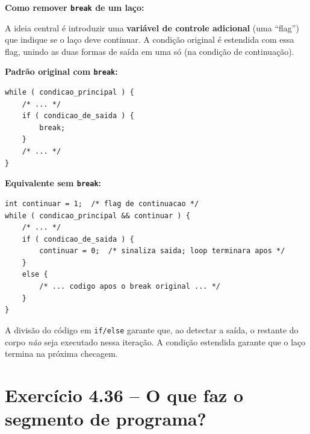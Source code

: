 \documentclass[12pt,a4paper]{article}
\begin{document}
\begin{respostabox}
\textbf{Como remover \texttt{break} de um laço:}

A ideia central é introduzir uma \textbf{variável de controle adicional} (uma ``flag'')
que indique se o laço deve continuar. A condição original é estendida com essa flag,
unindo as duas formas de saída em uma só (na condição de continuação).

\textbf{Padrão original com \texttt{break}:}
\begin{lstlisting}
while ( condicao_principal ) {
    /* ... */
    if ( condicao_de_saida ) {
        break;
    }
    /* ... */
}
\end{lstlisting}

\textbf{Equivalente sem \texttt{break}:}
\begin{lstlisting}
int continuar = 1;  /* flag de continuacao */
while ( condicao_principal && continuar ) {
    /* ... */
    if ( condicao_de_saida ) {
        continuar = 0;  /* sinaliza saida; loop terminara apos */
    }
    else {
        /* ... codigo apos o break original ... */
    }
}
\end{lstlisting}

A divisão do código em \texttt{if/else} garante que, ao detectar a saída, o restante
do corpo \textit{não} seja executado nessa iteração. A condição estendida garante que
o laço termina na próxima checagem.
\end{respostabox}

\newpage

\section{Exercício 4.36 -- O que faz o segmento de programa?}
\end{document}
